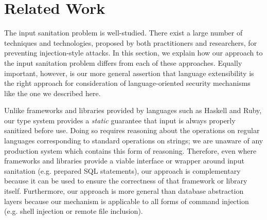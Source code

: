 \documentclass[9pt]{sig-alternate}
\theoremstyle{definition}
\begin{document}




\section{Related Work}\label{related}



The input sanitation problem is well-studied. There exist a large number of techniques and technologies, proposed by both practitioners and researchers, for preventing injection-style attacks. In this section, we explain how our approach to the input sanitation problem differs from each of these approaches. Equally important, however, is our more general assertion that language extensibility is the right approach for  consideration of language-oriented security mechanisms like the one we described here.

Unlike {frameworks and libraries} provided by languages such as Haskell and Ruby, our type system provides a \emph{static} guarantee that input is always properly sanitized before use. Doing so requires reasoning about the operations on regular languages corresponding to standard operations on strings; we are unaware of any production system which contains this form of reasoning. Therefore, even where frameworks and libraries provide a viable interface or wrapper around input sanitation (e.g. prepared SQL statements), our approach is complementary because it can be used to ensure the correctness of that framework or library itself. Furthermore, our approach is more general than database abstraction layers because our mechanism is applicable to all forms of command injection (e.g. shell injection or remote file inclusion).
\end{document}
